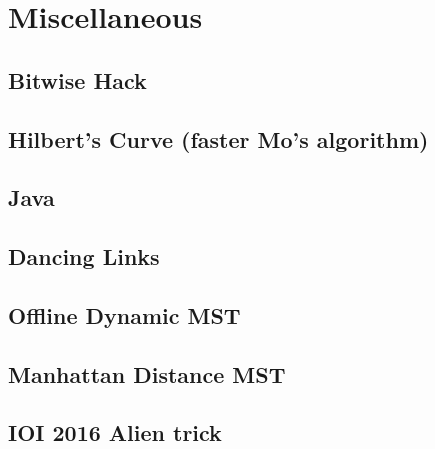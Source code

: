 \documentclass[a4paper,10pt,twocolumn,oneside]{article}
\begin{document}
\section{Miscellaneous}
\subsection{Bitwise Hack}

\subsection{Hilbert's Curve (faster Mo's algorithm)}

\subsection{Java}

\subsection{Dancing Links}

\subsection{Offline Dynamic MST}

\subsection{Manhattan Distance MST}

% 
% 
\subsection{IOI 2016 Alien trick}

% 
\end{document}
